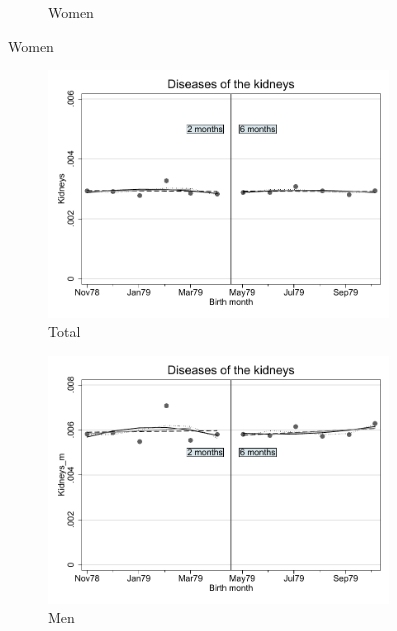 \documentclass[a4paper ]{article}
\begin{document}
\begin{figure}[h!]
\begin{subfigure}[t]{0.31\textwidth}
		\caption{Women}
	\end{subfigure}
\end{figure}
\newpage
\begin{figure}[h]
	\centering
	\begin{subfigure}[t]{0.31\textwidth}
		\centering
		\includegraphics[width=0.99\textwidth]{R1_RD_Kidneys_fits}
		\caption{Total}		
	\end{subfigure}
	\begin{subfigure}[t]{0.31\textwidth}
		\centering
		\includegraphics[width=0.99\textwidth]{R1_RD_Kidneys_m_fits}
		\caption{Men}		
	\end{subfigure}
	\quad
	\begin{subfigure}[t]{0.31\textwidth}

\end{subfigure}
\end{figure}
\end{document}
